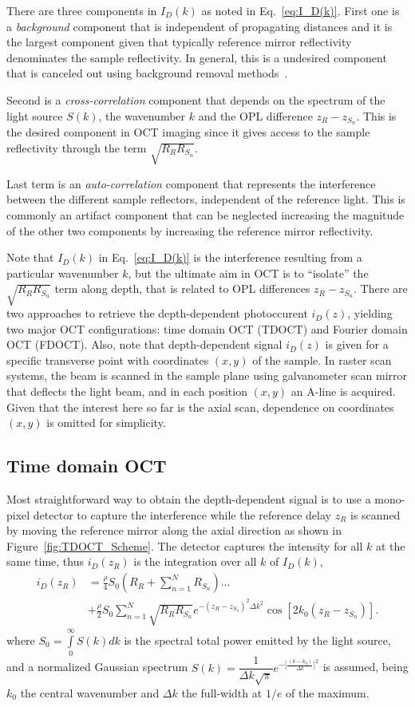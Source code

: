 There are three components in $I_D(k)$ as noted in Eq.~\eqref{eq:I_D(k)}. First one is a \textit{background} component that is independent of propagating distances and it is the largest component given that typically reference mirror reflectivity denominates the sample reflectivity. In general, this is a undesired component that is canceled out using background removal methods~\cite{}.

Second is a \textit{cross-correlation} component that depends on the spectrum of the light source $S(k)$, the wavenumber $k$ and the OPL difference $z_R-z_{S_n}$. This is the desired component in OCT imaging since it gives access to the sample reflectivity through the term $\sqrt{R_RR_{S_n}}$.

Last term is an \textit{auto-correlation} component that represents the interference between the different sample reflectors, independent of the reference light. This is commonly an artifact component that can be neglected increasing the magnitude of the other two components by increasing the reference mirror reflectivity.

Note that $I_D(k)$ in Eq.~\eqref{eq:I_D(k)} is the interference resulting from a particular wavenumber $k$, but the ultimate aim in OCT is to ``isolate'' the $\sqrt{R_RR_{S_n}}$ term along depth, that is related to OPL differences $z_R-z_{S_n}$. There are two approaches to retrieve the depth-dependent photoccurent $i_D(z)$, yielding two major OCT configurations: time domain OCT (TDOCT) and Fourier domain OCT (FDOCT). Also, note that depth-dependent signal $i_D(z)$ is given for a specific transverse point with coordinates $(x,y)$ of the sample. In raster scan systems, the beam is scanned in the sample plane using galvanometer scan mirror that deflects the light beam, and in each position $(x,y)$ an A-line is acquired. Given that the interest here so far is the axial scan, dependence on coordinates $(x,y)$ is omitted for simplicity.

\subsection{Time domain OCT}

Most straightforward way to obtain the depth-dependent signal is to use a mono-pixel detector to capture the interference while the reference delay $z_R$ is scanned by moving the reference mirror along the axial direction as shown in Figure~\ref{fig:TDOCT_Scheme}. The detector captures the intensity for all $k$ at the same time, thus $i_D(z_R)$ is the integration over all $k$ of $I_D(k)$, 
\begin{align}
    i_D(z_R) &= \frac{\rho}{4}S_0\left(R_R+\sum_{n=1}^N R_{S_n}\right)... \nonumber \\
    &+ \frac{\rho}{2}S_0 \sum_{n=1}^N \sqrt{R_RR_{S_n}} e^{-\left(z_R-z_{S_n}\right)^2 \Delta k^2}\cos\left[2k_0\left(z_R-z_{S_n}\right)\right].
\end{align}
where $S_0 = \int\limits_{0}^\infty S(k)dk$ is the spectral total power emitted by the light source, and a normalized Gaussian spectrum $S(k) =\dfrac{1}{\Delta k\sqrt{\pi}}e^{-\big[\frac{(k-k_0)}{\Delta k}\big]^2}$ is assumed, being $k_0$ the central wavenumber and $\Delta k$ the full-width at $1/e$ of the maximum.

